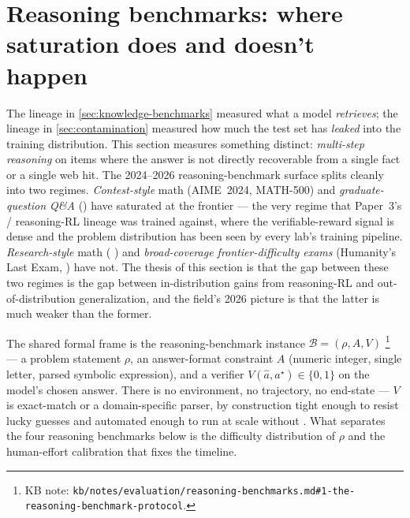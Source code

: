 
\section{Reasoning benchmarks: where saturation does and doesn't happen}
\label{sec:reasoning-benchmarks}

The lineage in \cref{sec:knowledge-benchmarks} measured what a model
\emph{retrieves}; the lineage in \cref{sec:contamination} measured how
much the test set has \emph{leaked} into the training distribution.
This section measures something distinct: \emph{multi-step reasoning}
on items where the answer is not directly recoverable from a single
fact or a single web hit. The 2024--2026 reasoning-benchmark surface
splits cleanly into two regimes. \emph{Contest-style} math
(AIME~2024, MATH-500) and \emph{graduate-question Q\&A} ()
have saturated at the frontier --- the very regime that Paper~3's
/ reasoning-RL lineage was trained against, where the
verifiable-reward signal is dense and the problem distribution has
been seen by every lab's training pipeline. \emph{Research-style}
math ( \citep{glazer2024-frontiermath}) and
\emph{broad-coverage frontier-difficulty exams} (Humanity's Last
Exam,  \citep{phan2025-hle}) have not. The thesis of this section
is that the gap between these two regimes is the gap between
in-distribution gains from reasoning-RL and out-of-distribution
generalization, and the field's 2026 picture is that the latter is
much weaker than the former.

The shared formal frame is the reasoning-benchmark instance
$\mathcal{B} = (\rho, A, V)$%
\footnote{KB note: \texttt{kb/notes/evaluation/reasoning-benchmarks.md\#1-the-reasoning-benchmark-protocol}.}
--- a problem statement $\rho$, an answer-format constraint $A$
(numeric integer, single letter, parsed symbolic expression), and
a verifier $V(\hat{a}, a^\star) \in \{0, 1\}$ on the model's chosen
answer. There is no environment, no trajectory, no end-state ---
$V$ is exact-match or a domain-specific parser, by construction tight
enough to resist lucky guesses and automated enough to run at scale
without . What separates the four reasoning benchmarks
below is the difficulty distribution of $\rho$ and the human-effort
calibration that fixes the  timeline.

